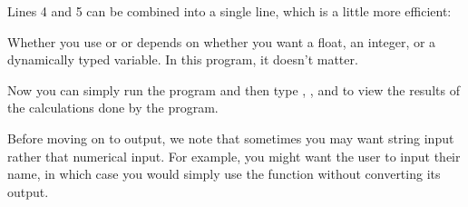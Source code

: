 \documentclass[letterpaper,10pt,english]{sphinxmanual}
\begin{document}
\begin{sphinxVerbatim}[commandchars=\\\{\},numbers=left,firstnumber=1,stepnumber=1]

  
  

                 
               
      

  
  
  
\end{sphinxVerbatim}

\sphinxAtStartPar
Lines 4 and 5 can be combined into a single line, which is a little more efficient:

\begin{sphinxVerbatim}[commandchars=\\\{\}]
  
\end{sphinxVerbatim}

\sphinxAtStartPar
Whether you use  or  or  depends on whether you want a float, an integer, or a dynamically typed variable.  In this program, it doesn’t matter.

\sphinxAtStartPar
Now you can simply run the program and then type , , and  to view the results of the calculations done by the program.

\sphinxAtStartPar
Before moving on to output, we note that sometimes you may want string input rather that numerical input.  For example, you might want the user to input their name, in which case you would simply use the  function without converting its output.
\end{document}
